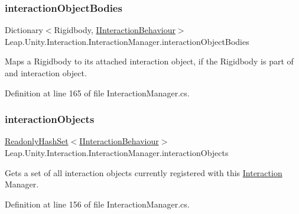 \subsubsection{\texorpdfstring{interactionObjectBodies}{interactionObjectBodies}}
{\footnotesize\ttfamily Dictionary$<$Rigidbody, \mbox{\hyperlink{interface_leap_1_1_unity_1_1_interaction_1_1_i_interaction_behaviour}{I\+Interaction\+Behaviour}}$>$ Leap.\+Unity.\+Interaction.\+Interaction\+Manager.\+interaction\+Object\+Bodies\hspace{0.3cm}{\ttfamily [get]}}



Maps a Rigidbody to its attached interaction object, if the Rigidbody is part of and interaction object. 



Definition at line 165 of file Interaction\+Manager.\+cs.

\mbox{\label{class_leap_1_1_unity_1_1_interaction_1_1_interaction_manager_ad34f64a6e84ba3bed98a4f386857d4e2}} 
\subsubsection{\texorpdfstring{interactionObjects}{interactionObjects}}
{\footnotesize\ttfamily \mbox{\hyperlink{struct_leap_1_1_unity_1_1_readonly_hash_set}{Readonly\+Hash\+Set}}$<$\mbox{\hyperlink{interface_leap_1_1_unity_1_1_interaction_1_1_i_interaction_behaviour}{I\+Interaction\+Behaviour}}$>$ Leap.\+Unity.\+Interaction.\+Interaction\+Manager.\+interaction\+Objects\hspace{0.3cm}{\ttfamily [get]}}



Gets a set of all interaction objects currently registered with this \mbox{\hyperlink{namespace_leap_1_1_unity_1_1_interaction}{Interaction}} Manager. 



Definition at line 156 of file Interaction\+Manager.\+cs.

\mbox{\label{class_leap_1_1_unity_1_1_interaction_1_1_interaction_manager_a129650833ce143b39615e9f2906a3669}} 
